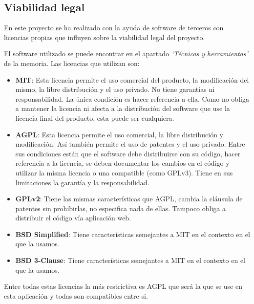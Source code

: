 \subsection{Viabilidad legal}

En este proyecto se ha realizado con la ayuda de software de terceros con licencias propias que influyen sobre la viabilidad legal del proyecto.

El software utilizado se puede encontrar en el apartado \textit{`Técnicas y herramientas'} de la memoria. Las licencias que utilizan son:

\begin{itemize}
	\item \textbf{MIT}: Esta licencia permite el uso comercial del producto, la modificación del mismo, la libre distribución y el uso privado. No tiene garantías ni responsabilidad. La única condición es hacer referencia a ella. Como no obliga a mantener la licencia ni afecta a la distribución del software que use la licencia final del producto, esta puede ser cualquiera.
	
	\item \textbf{AGPL}: Esta licencia permite el uso comercial, la libre distribución y modificación. Así también permite el uso de patentes y el uso privado. Entre sus condiciones están que el software debe distribuirse con su código, hacer referencia a la licencia, se deben documentar los cambios en el código y utilizar la misma licencia o una compatible (como GPLv3). Tiene en sus limitaciones la garantía y la responsabilidad.
	
	\item \textbf{GPLv2}: Tiene las mismas características que AGPL, cambia la cláusula de patentes sin prohibirlas, no especifica nada de ellas. Tampoco obliga a distribuir el código vía aplicación web.	
	
	\item \textbf{BSD Simplified}: Tiene características semejantes a MIT en el contexto en el que la usamos.
	
	\item \textbf{BSD 3-Clause}: Tiene características semejantes a MIT en el contexto en el que la usamos.
\end{itemize}

Entre todas estas licencias la más restrictiva es AGPL que será la que se use en esta aplicación y todas son compatibles entre si.

